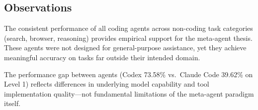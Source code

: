 \subsection{Observations}

The consistent performance of all coding agents across non-coding task categories (search, browser, reasoning) provides empirical support for the meta-agent thesis. These agents were not designed for general-purpose assistance, yet they achieve meaningful accuracy on tasks far outside their intended domain.

The performance gap between agents (Codex 73.58\% vs.\ Claude Code 39.62\% on Level 1) reflects differences in underlying model capability and tool implementation quality---not fundamental limitations of the meta-agent paradigm itself.
